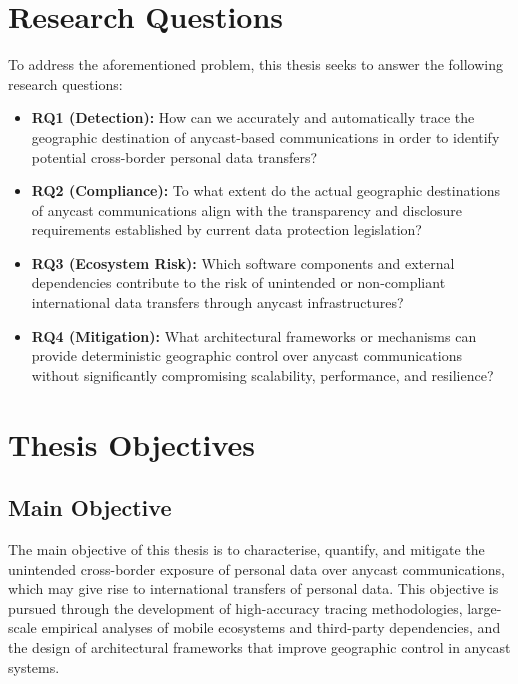 \section{Research Questions}
\label{sc:introduction_rqs}

To address the aforementioned problem, this thesis seeks to answer the following research questions:

\begin{itemize}

    \item \textbf{RQ1 (Detection):} How can we accurately and automatically trace the geographic destination of anycast-based communications in order to identify potential cross-border personal data transfers?

    \item \textbf{RQ2 (Compliance):} To what extent do the actual geographic destinations of anycast communications align with the transparency and disclosure requirements established by current data protection legislation?
    
    \item \textbf{RQ3 (Ecosystem Risk):} Which software components and external dependencies contribute to the risk of unintended or non-compliant international data transfers through anycast infrastructures?

    \item \textbf{RQ4 (Mitigation):} What architectural frameworks or mechanisms can provide deterministic geographic control over anycast communications without significantly compromising scalability, performance, and resilience?

\end{itemize}

\section{Thesis Objectives}
\label{sc:introduction_objectives}

\subsection{Main Objective}
\label{sc:introduction_objectives_main}

The main objective of this thesis is to characterise, quantify, and mitigate the unintended cross-border exposure of personal data over anycast communications, which may give rise to international transfers of personal data. This objective is pursued through the development of high-accuracy tracing methodologies, large-scale empirical analyses of mobile ecosystems and third-party dependencies, and the design of architectural frameworks that improve geographic control in anycast systems.

